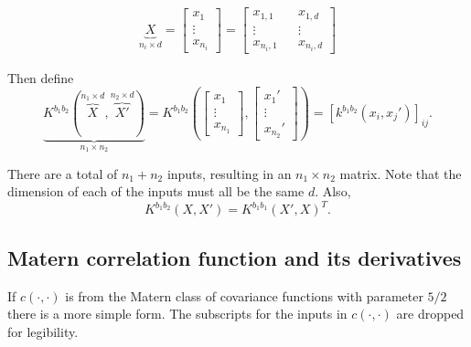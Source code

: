 \documentclass{sfuthesis}
\begin{document}
\begin{align}
\underbrace X_{{n_i} \times d} = \left[ {\begin{array}{*{20}{c}}
{{x_1}}\\
 \vdots \\
{{x_{{n_i}}}}
\end{array}} \right] = \left[ {\begin{array}{*{20}{c}}
{{x_{ {1,1} }}}&{}&{{x_{ {1,d} }}}\\
 \vdots &{}& \vdots \\
{{x_{ {{n_i},1} }}}&{}&{{x_{ {{n_i},d} }}}
\end{array}} \right]
\end{align}

Then define
\begin{equation}
  \underbrace {{K^{{b_1}{b_2}}}\left( {\overbrace X^{{n_1} \times d},\overbrace {X'}^{{n_2} \times d}} \right)}_{{n_1} \times {n_2}} = {K^{{b_1}{b_2}}}\left( {\left[ {\begin{array}{*{20}{c}}
{{x_1}}\\
 \vdots \\
{{x_{{n_1}}}}
\end{array}} \right],\left[ {\begin{array}{*{20}{c}}
{{x_1}'}\\
 \vdots \\
{{x_{{n_2}}}'}
\end{array}} \right]} \right) = {\left[ {{k^{{b_1}{b_2}}}\left( {{x_i},{x_j}'} \right)} \right]_{ij}}.
\end{equation}

There are a total of $n_1 + n_2$ inputs, resulting in an $n_1 \times n_2$ matrix. Note that the dimension of each of the inputs must all be the same $d$. 
Also,
\begin{equation}
  {K^{{b_1}{b_2}}}\left( {X,X'} \right) = {K^{{b_1}{b_1}}}{\left( {X',X} \right)^T}.
\end{equation}


\subsection{Matern correlation function and its derivatives}

If $c(\cdot, \cdot)$ is from the Matern class of covariance functions with parameter $5/2$ there is a more simple form. The subscripts for the inputs in $c(\cdot, \cdot)$ are dropped for legibility. 
\end{document}
